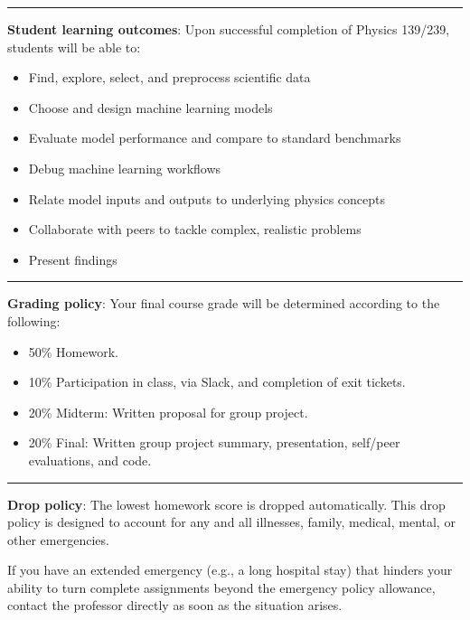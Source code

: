 \documentclass[12pt]{article}
\begin{document}
\begin{center}
	\rule{\textwidth}{0.5pt}
\end{center}

\noindent\textbf{Student learning outcomes}: Upon successful completion of Physics 139/239, students will be able to:
\begin{itemize}
	\item Find, explore, select, and preprocess scientific data
	\item Choose and design machine learning models
	\item Evaluate model performance and compare to standard benchmarks
	\item Debug machine learning workflows
	\item Relate model inputs and outputs to underlying physics concepts
	\item Collaborate with peers to tackle complex, realistic problems
	\item Present findings
\end{itemize}

\begin{center}
	\rule{\textwidth}{0.5pt}
\end{center}

\noindent\textbf{Grading policy}: Your final course grade will be determined according to the following:
\begin{itemize}
	\item 50\% Homework.
	\item 10\% Participation in class, via Slack, and completion of exit tickets.
	\item 20\% Midterm: Written proposal for group project.
	\item 20\% Final: Written group project summary, presentation, self/peer evaluations, and code.
\end{itemize}

\begin{center}
	\rule{\textwidth}{0.5pt}
\end{center}

\noindent\textbf{Drop policy}: The lowest homework score is dropped automatically.
This drop policy is designed to account for any and all illnesses, family, medical, mental, or other emergencies.

If you have an extended emergency (e.g., a long hospital stay) that hinders your ability to turn complete assignments beyond the emergency policy allowance, contact the professor directly as soon as the situation arises.
\end{document}
